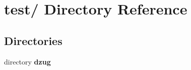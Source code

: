 \section{test/ Directory Reference}
\label{dir_0cc12765935516c926218621d312f6fc}
\subsection*{Directories}
\begin{CompactItemize}
\item 
directory {\bf dzug}
\end{CompactItemize}
